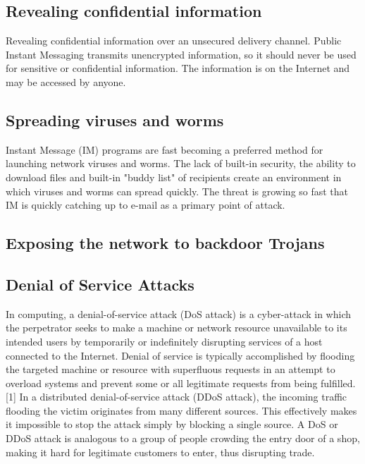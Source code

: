 \subsection{Revealing confidential information}\label{subsec:revealing-confidential-information}
Revealing confidential information over an unsecured delivery channel.
Public Instant Messaging transmits unencrypted information, so it should never be used for sensitive or confidential
information.
The information is on the Internet and may be accessed by anyone.

\subsection{Spreading viruses and worms}\label{subsec:spreading-viruses-and-worms}
Instant Message (IM) programs are fast becoming a preferred method for launching network viruses and worms.
The lack of built-in security, the ability to download files and built-in "buddy list" of recipients create an
environment in which viruses and worms can spread quickly.
The threat is growing so fast that IM is quickly catching up to e-mail as a primary point of attack.

\subsection{Exposing the network to backdoor Trojans}\label{subsec:exposing-the-network-to-backdoor-trojans}

\subsection{Denial of Service Attacks}\label{subsec:denial-of-service-attacks}

In computing, a denial-of-service attack (DoS attack) is a cyber-attack in which the perpetrator seeks to make a machine or
network resource unavailable to its intended users by temporarily or indefinitely disrupting services of a host connected
to the Internet.
Denial of service is typically accomplished by flooding the targeted machine or resource with superfluous requests in
an attempt to overload systems and prevent some or all legitimate requests from being fulfilled.[1]
In a distributed denial-of-service attack (DDoS attack), the incoming traffic flooding the victim originates from
many different sources.
This effectively makes it impossible to stop the attack simply by blocking a single source.
A DoS or DDoS attack is analogous to a group of people crowding the entry door of a shop, making it hard for legitimate
customers to enter, thus disrupting trade.

